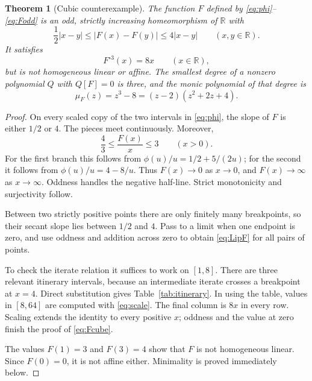 \documentclass[11pt,letterpaper]{article}
\newtheorem{theorem}{Theorem}[section]
\theoremstyle{definition}
\theoremstyle{remark}
\newcommand{\R}{\mathbb R}
\newcommand{\itn}[2]{#1^{\circ #2}}
\begin{document}
\begin{theorem}[Cubic counterexample]
\label{thm:cubic}
The function $F$ defined by \eqref{eq:phi}--\eqref{eq:Fodd} is an odd,
strictly increasing homeomorphism of $\R$ with
\begin{equation}
  \frac12|x-y|\le |F(x)-F(y)|\le4|x-y|\qquad(x,y\in\R).
  \label{eq:LipF}
\end{equation}
It satisfies
\begin{equation}
  \itn{F}{3}(x)=8x\qquad(x\in\R),
  \label{eq:Fcube}
\end{equation}
but is not homogeneous linear or affine. The smallest degree of a nonzero
polynomial $Q$ with $Q[F]=0$ is three, and the monic polynomial of that
degree is
\begin{equation}
  \mu_F(z)=z^3-8=(z-2)(z^2+2z+4).
  \label{eq:minF}
\end{equation}
\end{theorem}

\begin{proof}
On every scaled copy of the two intervals in \eqref{eq:phi}, the slope of
$F$ is either $1/2$ or $4$. The pieces meet continuously. Moreover,
\begin{equation}
  \frac43\le\frac{F(x)}x\le3\qquad(x>0).
  \label{eq:ratioF}
\end{equation}
For the first branch this follows from
$\phi(u)/u=1/2+5/(2u)$; for the second it follows from
$\phi(u)/u=4-8/u$. Thus $F(x)\to0$ as $x\to0$, and $F(x)\to\infty$ as
$x\to\infty$. Oddness handles the negative half-line. Strict monotonicity
and surjectivity follow.

Between two strictly positive points there are only finitely many
breakpoints, so their secant slope lies between $1/2$ and $4$.
Pass to a limit when one endpoint is zero, and use oddness and addition
across zero to obtain \eqref{eq:LipF} for all pairs of points.

To check the iterate relation it suffices to work on $[1,8]$.
There are three relevant itinerary intervals, because an intermediate
iterate crosses a breakpoint at $x=4$. Direct substitution gives
Table~\ref{tab:itinerary}. In using the table, values in $[8,64]$ are
computed with \eqref{eq:scale}. The final column is $8x$ in every row.
Scaling extends the identity to every positive $x$; oddness and the value
at zero finish the proof of \eqref{eq:Fcube}.

The values $F(1)=3$ and $F(3)=4$ show that $F$ is not homogeneous linear.
Since $F(0)=0$, it is not affine either. Minimality is proved immediately
below.
\end{proof}
\end{document}
